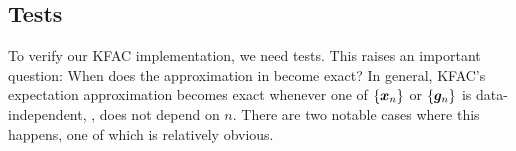 \subsection{Tests}

To verify our KFAC implementation, we need tests.
This raises an important question: When does the approximation in  become exact?
In general, KFAC's expectation approximation becomes exact whenever one of $\{{\bm{x}}_n\}$ or $\{{\bm{g}}_n\}$ is data-independent, \ie, does not depend on $n$.
There are two notable cases where this happens, one of which is relatively obvious.

